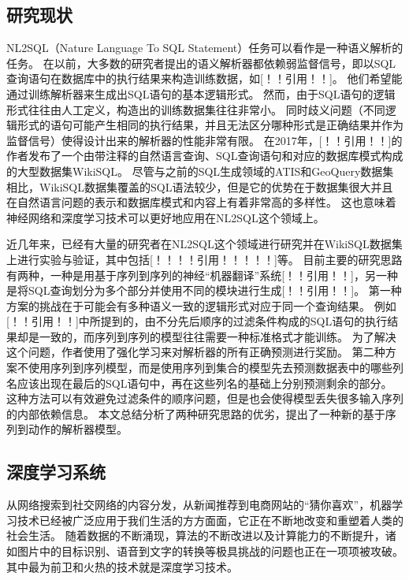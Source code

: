 \subsection{研究现状}

NL2SQL（Nature Language To SQL Statement）任务可以看作是一种语义解析的任务。
在以前，大多数的研究者提出的语义解析器都依赖弱监督信号，即以SQL查询语句在数据库中的执行结果来构造训练数据，如[！！引用！！]。
他们希望能通过训练解析器来生成出SQL语句的基本逻辑形式。
然而，由于SQL语句的逻辑形式往往由人工定义，构造出的训练数据集往往非常小。
同时歧义问题（不同逻辑形式的语句可能产生相同的执行结果，并且无法区分哪种形式是正确结果并作为监督信号）使得设计出来的解析器的性能非常有限。
在2017年，[！！引用！！]的作者发布了一个由带注释的自然语言查询、SQL查询语句和对应的数据库模式构成的大型数据集WikiSQL。
尽管与之前的SQL生成领域的ATIS和GeoQuery数据集相比，WikiSQL数据集覆盖的SQL语法较少，但是它的优势在于数据集很大并且在自然语言问题的表示和数据库模式和内容上有着非常高的多样性。
这也意味着神经网络和深度学习技术可以更好地应用在NL2SQL这个领域上。

近几年来，已经有大量的研究者在NL2SQL这个领域进行研究并在WikiSQL数据集上进行实验与验证，其中包括[！！！！引用！！！！！]等。
目前主要的研究思路有两种，一种是用基于序列到序列的神经“机器翻译”系统[！！引用！！]，另一种是将SQL查询划分为多个部分并使用不同的模块进行生成[！！引用！！]。
第一种方案的挑战在于可能会有多种语义一致的逻辑形式对应于同一个查询结果。
例如[！！引用！！]中所提到的，由不分先后顺序的过滤条件构成的SQL语句的执行结果却是一致的，而序列到序列的模型往往需要一种标准格式才能训练。
为了解决这个问题，作者使用了强化学习来对解析器的所有正确预测进行奖励。
第二种方案不使用序列到序列模型，而是使用序列到集合的模型先去预测数据表中的哪些列名应该出现在最后的SQL语句中，再在这些列名的基础上分别预测剩余的部分。
这种方法可以有效避免过滤条件的顺序问题，但是也会使得模型丢失很多输入序列的内部依赖信息。
本文总结分析了两种研究思路的优劣，提出了一种新的基于序列到动作的解析器模型。

\subsection{深度学习系统}


从网络搜索到社交网络的内容分发，从新闻推荐到电商网站的“猜你喜欢”，机器学习技术已经被广泛应用于我们生活的方方面面，它正在不断地改变和重塑着人类的社会生活。
随着数据的不断涌现，算法的不断改进以及计算能力的不断提升，诸如图片中的目标识别、语音到文字的转换等极具挑战的问题也正在一项项被攻破。
其中最为前卫和火热的技术就是深度学习技术。

